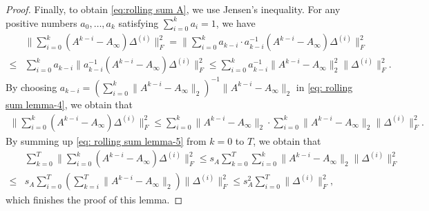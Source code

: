 \documentclass[10pt,a4paper]{amsart}
\newcommand{\norm}[1]{\| #1 \|}
\begin{document}
\begin{proof}
Finally, to obtain \eqref{eq:rolling sum A}, we use Jensen's inequality. For any positive numbers $a_0,\ldots,a_k$ satisfying $\sum_{i=0}^{k} a_i=1$, we have
\begin{align}\label{eq: rolling sum lemma-4}
     &\norm{\sum_{i=0}^k(A^{k-i}-A_\infty)\Delta^{(i)}}_F^2=\norm{\sum_{i=0}^k a_{k-i}\cdot a_{k-i}^{-1}(A^{k-i}-A_\infty)\Delta^{(i)}}_F^2\\
    \le& \sum_{i=0}^k a_{k-i}\norm{a_{k-i}^{-1}(A^{k-i}-A_\infty)\Delta^{(i)}}_F^2\le \sum_{i=0}^k a_{k-i}^{-1}\norm{A^{k-i}-A_\infty}_2^2\norm{\Delta^{(i)}}_F^2.\nonumber
\end{align}
By choosing $a_{k-i}=(\sum_{i=0}^k\norm{A^{k-i}-A_\infty}_2)^{-1}\norm{A^{k-i}-A_\infty}_2$ in \eqref{eq: rolling sum lemma-4}, we obtain that
\begin{align}\label{eq: rolling sum lemma-5}
    \norm{\sum_{i=0}^k(A^{k-i}-A_\infty)\Delta^{(i)}}_F^2\le \sum_{i=0}^k\norm{A^{k-i}-A_\infty}_2\cdot\sum_{i=0}^k\norm{A^{k-i}-A_\infty}_2\norm{\Delta^{(i)}}_F^2.
\end{align}
By summing up \eqref{eq: rolling sum lemma-5} from $k=0$ to $T$, we obtain that
\begin{align*}
    &\sum_{k=0}^T\norm{\sum_{i=0}^k(A^{k-i}-A_\infty)\Delta^{(i)}}_F^2 \le s_A\sum_{k=0}^T\sum_{i=0}^k\norm{A^{k-i}-A_\infty}_2\norm{\Delta^{(i)}}_F^2\\
    \le& s_A \sum_{i=0}^T\!\left(\sum_{k=i}^T\norm{A^{k-i}-A_\infty}_2\right)\norm{\Delta^{(i)}}_F^2\le s_A^2\sum_{i=0}^T\norm{\Delta^{(i)}}_F^2,
\end{align*}
which finishes the proof of this lemma.
\end{proof}
\end{document}
